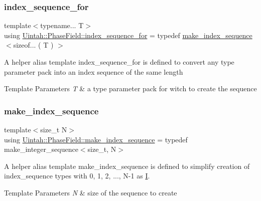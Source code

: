 \subsubsection{\texorpdfstring{index\+\_\+sequence\+\_\+for}{index\_sequence\_for}}
{\footnotesize\ttfamily template$<$typename... T$>$ \\
using \hyperlink{namespaceUintah_1_1PhaseField_aa968ce550e38b580ce27a9f84cdf4145}{Uintah\+::\+Phase\+Field\+::index\+\_\+sequence\+\_\+for} = typedef \hyperlink{namespaceUintah_1_1PhaseField_ade9c143d53e56548b5b227e5b58415a5}{make\+\_\+index\+\_\+sequence}$<$sizeof... ( T ) $>$}

A helper alias template index\+\_\+sequence\+\_\+for is defined to convert any type parameter pack into an index sequence of the same length


\begin{DoxyTemplParams}{Template Parameters}
{\em T} & a type parameter pack for witch to create the sequence \\
\hline
\end{DoxyTemplParams}
\mbox{\label{namespaceUintah_1_1PhaseField_ade9c143d53e56548b5b227e5b58415a5}} 
\subsubsection{\texorpdfstring{make\+\_\+index\+\_\+sequence}{make\_index\_sequence}}
{\footnotesize\ttfamily template$<$size\+\_\+t N$>$ \\
using \hyperlink{namespaceUintah_1_1PhaseField_ade9c143d53e56548b5b227e5b58415a5}{Uintah\+::\+Phase\+Field\+::make\+\_\+index\+\_\+sequence} = typedef make\+\_\+integer\+\_\+sequence$<$size\+\_\+t, N$>$}

A helper alias template make\+\_\+index\+\_\+sequence is defined to simplify creation of index\+\_\+sequence types with 0, 1, 2, ..., N-\/1 as \hyperlink{structUintah_1_1PhaseField_1_1I}{I}. 
\begin{DoxyTemplParams}{Template Parameters}
{\em N} & size of the sequence to create \\
\hline
\end{DoxyTemplParams}
\mbox{\label{namespaceUintah_1_1PhaseField_a8b672bdd087de9e7387512bfe7c7d3a4}} 
